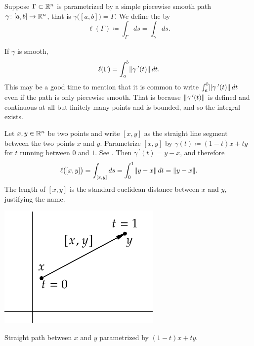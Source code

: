 \begin{defn}
Suppose $\Gamma \subset {\mathbb{R}}^n$ is parametrized by a simple
piecewise smooth path $\gamma \colon [a,b] \to {\mathbb{R}}^n$, that is
$\gamma\bigl( [a,b] \bigr) = \Gamma$.  We define the
\emph{} by
\begin{equation*}
\ell(\Gamma) \coloneqq \int_{\Gamma} ds = \int_{\gamma} ds .
\end{equation*}
\end{defn}

If $\gamma$ is smooth,
\begin{equation*}
\ell(\Gamma) = 
\int_a^b
\lVert {\gamma^{\:\prime}(t)} \rVert\, dt .
\end{equation*}
This may be a good time to mention that it is common to write
$\int_a^b
\lVert {\gamma^{\:\prime}(t)} \rVert\, dt$ even if the path is only piecewise smooth.
That is because $\lVert {\gamma^{\:\prime}(t)} \rVert$ is defined and continuous
at all but finitely many points and is bounded, and so the integral exists.

\begin{example}
Let $x,y \in {\mathbb{R}}^n$ be two points and write $[x,y]$ as the straight line
segment between the two points $x$ and $y$.  Parametrize
$[x,y]$ by $\gamma(t) \coloneqq (1-t)x + ty$ for $t$ running between $0$ and $1$.
See .
Then $\gamma^{\:\prime}(t) = y-x$, and therefore
\begin{equation*}
\ell\bigl([x,y]\bigr)
=
\int_{[x,y]} ds
=
\int_0^1 \lVert {y-x} \rVert \, dt
=
\lVert {y-x} \rVert .
\end{equation*}
The length of $[x,y]$ is the standard euclidean distance between $x$ and $y$,
justifying the name.
\begin{myfigureht}
\includegraphics{figures/straightpath}
\caption{Straight path between $x$ and $y$ parametrized
by $(1-t)x + ty$.\label{fig:straightpath}}
\end{myfigureht}
\end{example}

